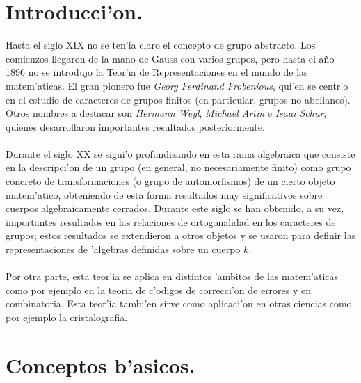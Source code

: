 \documentclass[a4paper,openright,12pt]{report}
\numberwithin{equation}{section} %
\begin{document}
\chapter*{Introducci'on.}
Hasta el siglo XIX no se ten'ia claro el concepto de grupo abstracto. Los comienzos llegaron de la mano de Gauss con varios grupos, pero hasta el a\~no 1896 no se introdujo la Teor'ia de Representaciones en el mundo de las matem'aticas. El gran pionero fue \textit{Georg Ferdinand Frobenious}, qui'en se centr'o en el estudio de caracteres de grupos finitos (en particular, grupos no abelianos). Otros nombres a destacar son \textit{Hermann Weyl}, \textit{Michael Artin} e \textit{Isaai Schur}, quienes desarrollaron importantes resultados posteriormente.\\
\\
Durante el siglo XX se sigui'o profundizando en esta rama algebraica que consiste en la descripci'on de un grupo (en general, no necesariamente finito) como grupo concreto de transformaciones (o grupo de automorfismos) de un cierto objeto matem'atico, obteniendo de esta forma resultados muy significativos sobre cuerpos algebraicamente cerrados. Durante este siglo se han obtenido, a su vez, importantes resultados en las relaciones de ortogonalidad en los caracteres de grupos; estos resultados se extendieron a otros objetos y se usaron para definir las representaciones de 'algebras definidas sobre un cuerpo $k$.\\
\\
Por otra parte, esta teor'ia se aplica en distintos 'ambitos de las matem'aticas como por ejemplo en la teoria de c'odigos de correcci'on de errores y en combinatoria. Esta teor'ia tambi'en sirve como aplicaci'on en otras ciencias como por ejemplo la cristalografia.
\chapter{Conceptos b'asicos.}
\end{document}
